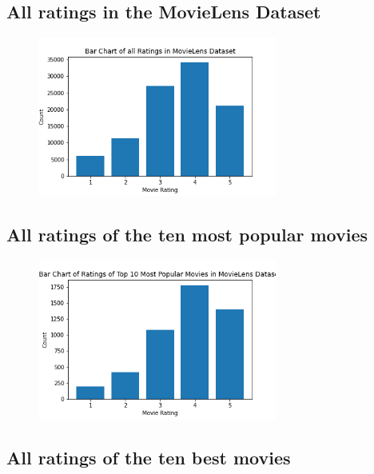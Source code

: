 \documentclass{article}
\begin{document}
\subsection{All ratings in the MovieLens Dataset}

\begin{figure}[H] \begin{center}
\includegraphics[width=0.7\textwidth]{basicvisualizations/Bar Chart of All Ratings.png}
\end{center} \end{figure}

\subsection{All ratings of the ten most popular movies}

\begin{figure}[H] \begin{center}
\includegraphics[width=0.7\textwidth]{basicvisualizations/Bar Chart of Top 10 Most Popular Movies Ratings.png}
\end{center} \end{figure}

\subsection{All ratings of the ten best movies}
\end{document}
